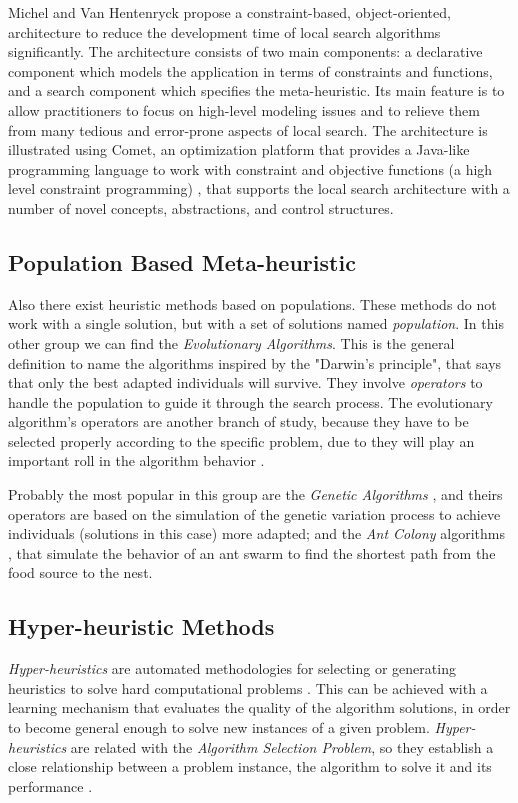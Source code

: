 Michel and Van Hentenryck \cite{Michel2002} propose a constraint-based, object-oriented, architecture to reduce the development time of local search algorithms significantly. The architecture consists of two main components: a declarative component which models the application in terms of constraints and functions, and a search component which specifies the meta-heuristic. Its main feature is to allow practitioners to focus on high-level modeling issues and to relieve them from many tedious and error-prone aspects of local search. The architecture is illustrated using {\sc Comet}, an optimization platform that provides a Java-like programming language to work with constraint and objective functions (a high level constraint programming) \cite{Comet, Michel2005}, that supports the local search architecture with a number of novel concepts, abstractions, and control structures.

\subsection{Population Based Meta-heuristic}

Also there exist heuristic methods based on populations. These methods do not work with a single solution, but with a set of solutions named {\it population}. In this other group we can find the {\it Evolutionary Algorithms}. This is the general definition to name the algorithms inspired by the "Darwin's principle", that says that only the best adapted individuals will survive. They involve {\it operators} to handle the population to guide it through the search process. The evolutionary algorithm's operators are another branch of study, because they have to be selected properly according to the specific problem, due to they will play an important roll in the algorithm behavior \cite{Maturana2012}. 

Probably the most popular in this group are the {\it Genetic Algorithms} \cite{Reeves2010}, and theirs operators are based on the simulation of the genetic variation  process to achieve individuals (solutions in this case) more adapted; and the {\it Ant Colony} algorithms \cite{Dorigo2010}, that simulate the behavior of an ant swarm to find the shortest path from the food source to the nest.

\subsection{Hyper-heuristic Methods}

\textit{Hyper-heuristics} are automated methodologies for selecting or generating heuristics to solve hard computational problems \cite{Chakhlevitch2008}. This can be achieved with a learning mechanism that evaluates the quality of the algorithm solutions, in order to become general enough to solve new instances of a given problem. \textit{Hyper-heuristics} are related with the \textit{Algorithm Selection Problem}, so they establish a close relationship between a problem instance, the algorithm to solve it and its performance \cite{Ryser-welch}.   

